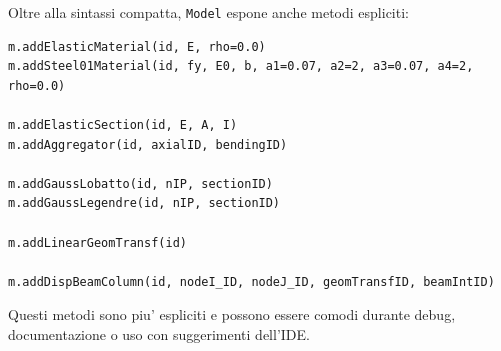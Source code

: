 \documentclass[11pt,a4paper]{article}
\begin{document}
Oltre alla sintassi compatta, \texttt{Model} espone anche metodi espliciti:

\begin{lstlisting}[style=pythonstyle]
m.addElasticMaterial(id, E, rho=0.0)
m.addSteel01Material(id, fy, E0, b, a1=0.07, a2=2, a3=0.07, a4=2, rho=0.0)

m.addElasticSection(id, E, A, I)
m.addAggregator(id, axialID, bendingID)

m.addGaussLobatto(id, nIP, sectionID)
m.addGaussLegendre(id, nIP, sectionID)

m.addLinearGeomTransf(id)

m.addDispBeamColumn(id, nodeI_ID, nodeJ_ID, geomTransfID, beamIntID)
\end{lstlisting}

Questi metodi sono piu' espliciti e possono essere comodi durante debug,
documentazione o uso con suggerimenti dell'IDE.
\end{document}
